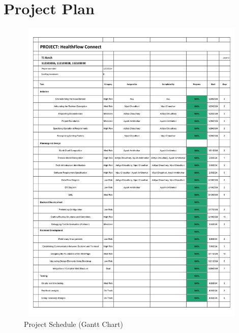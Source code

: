 \chapter{Project Plan}
\begin{figure}[!htb]
\centering
\includegraphics[width=16cm,height=15cm]{SE Project Gantt Chart Final.png}
\caption{Project Schedule (Gantt Chart)}
\end{figure}